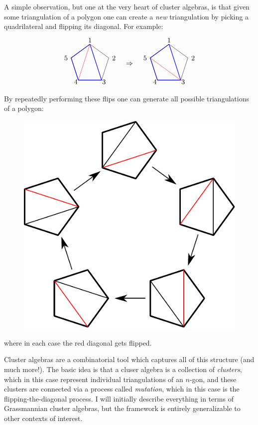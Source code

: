 \documentclass[11pt]{article}
\def\drawLabeledPentagon{
\coordinate (P1) at (90:1);
\coordinate (P2) at (18:1);
\coordinate (P3) at (306:1);
\coordinate (P4) at (234:1);
\coordinate (P5) at (162:1);
\draw (P1) -- (P2) -- (P3) -- (P4) -- (P5) -- cycle;
\draw (0,1.2) node {1};
\draw (1,.3) node[anchor=west] {2};
\draw (.5,-.9) node[anchor=west] {3};
\draw (-.5,-.9) node[anchor=east] {4};
\draw (-1,.3) node[anchor=east] {5};
}
\begin{document}
A simple observation, but one at the very heart of cluster algebras, is that given some triangulation of a polygon one can create a \emph{new} triangulation by picking a quadrilateral and flipping its diagonal. For example:
\begin{equation}
\begin{tikzpicture}
  \drawLabeledPentagon
  \draw[color=blue, thick] (P1) -- (P3) -- (P4) -- (P5) -- cycle;
  \draw[color=red] (P1) -- (P4);
  \draw (2,0) node {$\Rightarrow$};
\begin{scope}[xshift = 4cm]
  \drawLabeledPentagon
  \draw[color=blue, thick] (P1) -- (P3) -- (P4) -- (P5) -- cycle;
  \draw[color=red] (P5) -- (P3);
\end{scope}
\end{tikzpicture} 
\end{equation}
By repeatedly performing these flips one can generate all possible triangulations of a polygon:\pagebreak
\begin{figure}[h]
  \centering
  \includegraphics[scale=0.6]{pentagon-triangulations}
\end{figure}

\noindent where in each case the red diagonal gets flipped. 

Cluster algebras are a combinatorial tool which captures all of this structure (and much more!). The basic idea is that a cluser algebra is a collection of \emph{clusters}, which in this case represent individual triangulations of an $n$-gon, and these clusters are connected via a process called \emph{mutation}, which in this case is the flipping-the-diagonal process. I will initially describe everything in terms of Grassmannian cluster algebras, but the framework is entirely generalizable to other contexts of interest.
\end{document}
